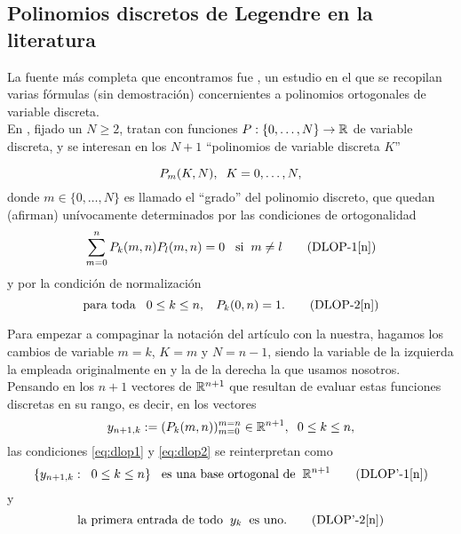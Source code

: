\subsection{Polinomios discretos de Legendre en la literatura}
La fuente más completa que encontramos 
fue \cite{Neuman}, un estudio en el que se recopilan 
varias fórmulas (sin demostración) concernientes a polinomios
ortogonales de variable discreta. \\

En \cite{Neuman}, 
fijado un $N \geq 2$,
tratan con funciones $P : \{0, \ldots , N \} \rightarrow \mathbb{R}$
de variable discreta, y 
se interesan en los $N+1$ ``polinomios de variable
discreta $K$''

\[
P_{m}(K, N), \hspace{0.2cm} K=0, \ldots , N,
\]
donde $m \in \{0, \ldots, N \}$ es llamado el ``grado''
del polinomio discreto, que quedan (afirman)
unívocamente determinados por las condiciones
de ortogonalidad
\begin{equation}
\sum\limits_{m=0}^{n}P_{k}(m,n) P_{l}(m,n) =0
\hspace{0.3cm} \text{si} \hspace{0.2cm} m \neq l \tag{DLOP-1[n]} \label{eq:dlop1}
\end{equation}
y por la condición de normalización
\begin{equation}
\text{para toda} \hspace{0.3cm} 0 \leq k \leq n, \hspace{0.3cm} P_{k}(0, n)=1.   \tag{DLOP-2[n]} \label{eq:dlop2}
\end{equation}

Para empezar a compaginar la notación
del artículo con la nuestra, 
hagamos
los cambios de variable $m=k$, $K=m$
y $N=n-1$, siendo la variable de la izquierda la empleada
originalmente en
\cite{Neuman} y la de la derecha la que usamos nosotros. \\

Pensando en los 
$n+1$ vectores de $\mathbb{R}^{n+1}$ que resultan
de evaluar estas funciones discretas en su rango,
es decir, en los vectores
\begin{equation}
y_{n+1, k}:= (P_{k}(m, n))_{m=0}^{m=n} \in \mathbb{R}^{n+1}, \hspace{0.2cm}
0 \leq k \leq n,
\end{equation}
las condiciones \eqref{eq:dlop1} y \eqref{eq:dlop2}
se reinterpretan como
\begin{equation}
\{ y_{n+1, k}: \hspace{0.2cm} 0 \leq k \leq n\}
\hspace{0.3cm} \text{es una
base ortogonal de} \hspace{0.2cm} \mathbb{R}^{n+1}
\tag{DLOP'-1[n]} \label{eq:dlop'1}
\end{equation}
y 
\begin{equation}
\text{la primera
entrada de todo} \hspace{0.2cm} y_{k} \hspace{0.2cm}
\text{es uno.} 
\tag{DLOP'-2[n]} \label{eq:dlop'2}
\end{equation}


